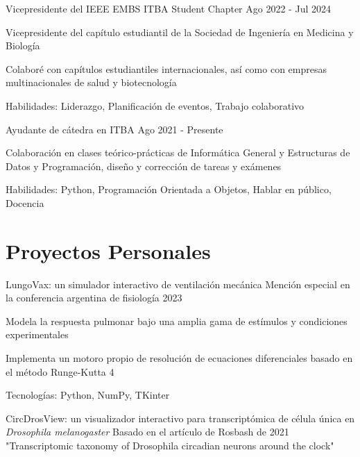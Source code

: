 \documentclass{resume}
\begin{document}
    \resumeSubheading
    {Vicepresidente del IEEE EMBS ITBA Student Chapter}{}
    {}{Ago 2022 - Jul 2024}
    \vspace{-5mm}
    \resumeItemListStart
    \item{Vicepresidente del capítulo estudiantil de la Sociedad de Ingeniería en Medicina y Biología}
    \item{Colaboré con capítulos estudiantiles internacionales,
        así como con empresas multinacionales de salud y biotecnología}
    \item {Habilidades: Liderazgo, Planificación de eventos, Trabajo colaborativo}
    \resumeItemListEnd


    \resumeSubheading
    {Ayudante de cátedra en ITBA}{}
    {}{Ago 2021 - Presente}
    \vspace{-5mm}
    \resumeItemListStart
    \item
    {Colaboración en clases teórico-prácticas de Informática General y Estructuras de Datos y Programación,
        diseño y corrección de tareas y exámenes}
    \item {Habilidades: Python, Programación Orientada a Objetos, Hablar en público, Docencia}
    \resumeItemListEnd
    \resumeSubHeadingListEnd

    \vspace{-5mm}


    \section{\textbf{Proyectos Personales}} \label{sec:projects}
    \resumeSubHeadingListStart
    \resumeProject
    {LungoVax: un simulador interactivo de ventilación mecánica} %
    {Mención especial en la conferencia argentina de fisiología 2023} %
    {} %

    \resumeItemListStart
    \item {Modela la respuesta pulmonar bajo una amplia gama de estímulos y condiciones experimentales}
    \item {Implementa un motoro propio de resolución de ecuaciones diferenciales basado en el método Runge-Kutta 4}
    \item {Tecnologías: Python, NumPy, TKinter}
    \resumeItemListEnd

    \resumeProject
    {CircDrosView: un visualizador interactivo para transcriptómica de célula única en \textit{Drosophila melanogaster}}
    {Basado en el artículo de Rosbash de 2021
    "Transcriptomic taxonomy of Drosophila circadian neurons around the clock"}
    {} %
\end{document}
